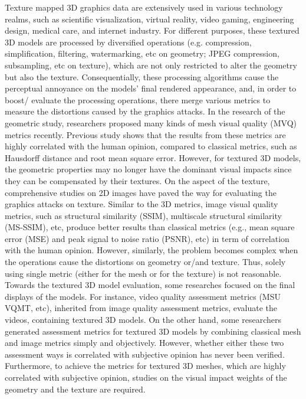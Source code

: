 Texture mapped 3D graphics data are extensively used in various technology realms, such as scientific visualization, virtual reality, video gaming, engineering design, medical care, and internet industry. For different purposes, these textured 3D models are processed by diversified operations (e.g. compression, simplification, filtering, watermarking, etc on
 geometry; JPEG compression, subsampling, etc on texture), which are not only restricted to alter the geometry but also the texture. Consequentially, these processing algorithms cause the perceptual annoyance on the models’ final rendered appearance, and, in order to boost/ evaluate the processing operations, there merge various metrics to measure the distortions caused by the graphics attacks. In the research of the geometric study, researchers proposed many kinds of mesh visual quality (MVQ) metrics recently. Previous study shows that the results from these metrics are highly correlated with the human opinion, compared to classical metrics, such as Hausdorff distance and root mean square error. However, for textured 3D models, the geometric properties may no longer have the dominant visual impacts since they can be compensated by their textures.  On the aspect of the texture, comprehensive studies on 2D images have paved the way for evaluating the graphics attacks on texture.  Similar to the 3D metrics, image visual quality metrics, such as structural similarity (SSIM), multiscale structural similarity (MS-SSIM), etc, produce better results than classical metrics (e.g., mean square error (MSE) and peak signal to noise ratio (PSNR), etc) in term of correlation with the human opinion. However, similarly, the problem becomes complex when the operations cause the distortions on geometry or/and texture. Thus, solely using single metric (either for the mesh or for the texture) is not reasonable. Towards the textured 3D model evaluation, some researches focused on the final displays of the models. For instance, video quality assessment metrics (MSU VQMT, etc), inherited from image quality assessment metrics, evaluate the videos, containing textured 3D models.  On the other hand, some researchers generated assessment metrics for textured 3D models by combining classical mesh and image metrics simply and objectively. However, whether either these two assessment ways is correlated with subjective opinion has never been verified. Furthermore, to achieve the metrics for textured 3D meshes, which are highly correlated with subjective opinion, studies on the visual impact weights of the geometry and the texture are required.